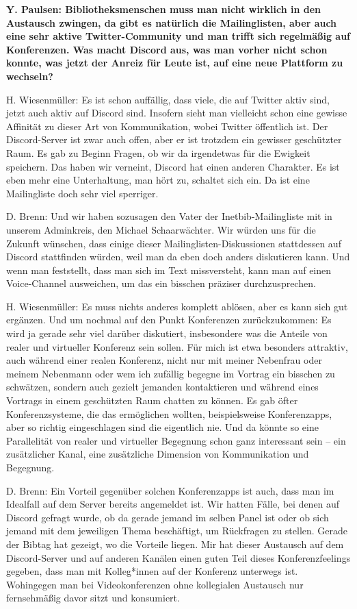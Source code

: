 \documentclass[a4paper,
fontsize=11pt,
oneside,
numbers=noperiodatend,
parskip=half-,
bibliography=totoc,
final
]{scrartcl}
\begin{document}
\textbf{Y. Paulsen: Bibliotheksmenschen muss man nicht wirklich in den
Austausch zwingen, da gibt es natürlich die Mailinglisten, aber auch
eine sehr aktive Twitter-Community und man trifft sich regelmäßig auf
Konferenzen. Was macht Discord aus, was man vorher nicht schon konnte,
was jetzt der Anreiz für Leute ist, auf eine neue Plattform zu
wechseln?}

H. Wiesenmüller: Es ist schon auffällig, dass viele, die auf Twitter
aktiv sind, jetzt auch aktiv auf Discord sind. Insofern sieht man
vielleicht schon eine gewisse Affinität zu dieser Art von Kommunikation,
wobei Twitter öffentlich ist. Der Discord-Server ist zwar auch offen,
aber er ist trotzdem ein gewisser geschützter Raum. Es gab zu Beginn
Fragen, ob wir da irgendetwas für die Ewigkeit speichern. Das haben wir
verneint, Discord hat einen anderen Charakter. Es ist eben mehr eine
Unterhaltung, man hört zu, schaltet sich ein. Da ist eine Mailingliste
doch sehr viel sperriger.

D. Brenn: Und wir haben sozusagen den Vater der Inetbib-Mailingliste mit
in unserem Adminkreis, den Michael Schaarwächter. Wir würden uns für die
Zukunft wünschen, dass einige dieser Mailinglisten-Diskussionen
stattdessen auf Discord stattfinden würden, weil man da eben doch anders
diskutieren kann. Und wenn man feststellt, dass man sich im Text
missversteht, kann man auf einen Voice-Channel ausweichen, um das ein
bisschen präziser durchzusprechen.

H. Wiesenmüller: Es muss nichts anderes komplett ablösen, aber es kann
sich gut ergänzen. Und um nochmal auf den Punkt Konferenzen
zurückzukommen: Es wird ja gerade sehr viel darüber diskutiert,
insbesondere was die Anteile von realer und virtueller Konferenz sein
sollen. Für mich ist etwa besonders attraktiv, auch während einer realen
Konferenz, nicht nur mit meiner Nebenfrau oder meinem Nebenmann oder wem
ich zufällig begegne im Vortrag ein bisschen zu schwätzen, sondern auch
gezielt jemanden kontaktieren und während eines Vortrags in einem
geschützten Raum chatten zu können. Es gab öfter Konferenzsysteme, die
das ermöglichen wollten, beispielsweise Konferenzapps, aber so richtig
eingeschlagen sind die eigentlich nie. Und da könnte so eine
Parallelität von realer und virtueller Begegnung schon ganz interessant
sein -- ein zusätzlicher Kanal, eine zusätzliche Dimension von
Kommunikation und Begegnung.

D. Brenn: Ein Vorteil gegenüber solchen Konferenzapps ist auch, dass man
im Idealfall auf dem Server bereits angemeldet ist. Wir hatten Fälle,
bei denen auf Discord gefragt wurde, ob da gerade jemand im selben Panel
ist oder ob sich jemand mit dem jeweiligen Thema beschäftigt, um
Rückfragen zu stellen. Gerade der Bibtag hat gezeigt, wo die Vorteile
liegen. Mir hat dieser Austausch auf dem Discord-Server und auf anderen
Kanälen einen guten Teil dieses Konferenzfeelings gegeben, dass man mit
Kolleg*innen auf der Konferenz unterwegs ist. Wohingegen man bei
Videokonferenzen ohne kollegialen Austausch nur fernsehmäßig davor sitzt
und konsumiert.
\end{document}
